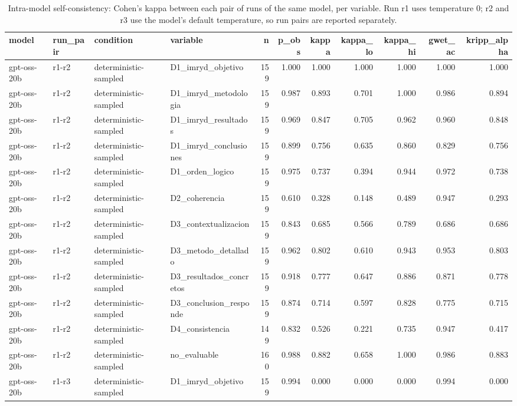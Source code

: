 \begin{table}
\caption{Intra-model self-consistency: Cohen's kappa between each pair of runs of the same model, per variable. Run r1 uses temperature 0; r2 and r3 use the model's default temperature, so run pairs are reported separately.}
\label{tab:selfconsistency}
\begin{tabular}{llllrrrrrrr}
\toprule
model & run\_pair & condition & variable & n & p\_obs & kappa & kappa\_lo & kappa\_hi & gwet\_ac & kripp\_alpha \\
\midrule
gpt-oss-20b & r1-r2 & deterministic-sampled & D1\_imryd\_objetivo & 159 & 1.000 & 1.000 & 1.000 & 1.000 & 1.000 & 1.000 \\
gpt-oss-20b & r1-r2 & deterministic-sampled & D1\_imryd\_metodologia & 159 & 0.987 & 0.893 & 0.701 & 1.000 & 0.986 & 0.894 \\
gpt-oss-20b & r1-r2 & deterministic-sampled & D1\_imryd\_resultados & 159 & 0.969 & 0.847 & 0.705 & 0.962 & 0.960 & 0.848 \\
gpt-oss-20b & r1-r2 & deterministic-sampled & D1\_imryd\_conclusiones & 159 & 0.899 & 0.756 & 0.635 & 0.860 & 0.829 & 0.756 \\
gpt-oss-20b & r1-r2 & deterministic-sampled & D1\_orden\_logico & 159 & 0.975 & 0.737 & 0.394 & 0.944 & 0.972 & 0.738 \\
gpt-oss-20b & r1-r2 & deterministic-sampled & D2\_coherencia & 159 & 0.610 & 0.328 & 0.148 & 0.489 & 0.947 & 0.293 \\
gpt-oss-20b & r1-r2 & deterministic-sampled & D3\_contextualizacion & 159 & 0.843 & 0.685 & 0.566 & 0.789 & 0.686 & 0.686 \\
gpt-oss-20b & r1-r2 & deterministic-sampled & D3\_metodo\_detallado & 159 & 0.962 & 0.802 & 0.610 & 0.943 & 0.953 & 0.803 \\
gpt-oss-20b & r1-r2 & deterministic-sampled & D3\_resultados\_concretos & 159 & 0.918 & 0.777 & 0.647 & 0.886 & 0.871 & 0.778 \\
gpt-oss-20b & r1-r2 & deterministic-sampled & D3\_conclusion\_responde & 159 & 0.874 & 0.714 & 0.597 & 0.828 & 0.775 & 0.715 \\
gpt-oss-20b & r1-r2 & deterministic-sampled & D4\_consistencia & 149 & 0.832 & 0.526 & 0.221 & 0.735 & 0.947 & 0.417 \\
gpt-oss-20b & r1-r2 & deterministic-sampled & no\_evaluable & 160 & 0.988 & 0.882 & 0.658 & 1.000 & 0.986 & 0.883 \\
gpt-oss-20b & r1-r3 & deterministic-sampled & D1\_imryd\_objetivo & 159 & 0.994 & 0.000 & 0.000 & 0.000 & 0.994 & 0.000 \\

\end{tabular}
\end{table}
